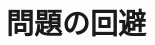 \documentclass[12pt,dvipdfmx,mathserif,uplatex,aspectratio=32]{beamer}
\begin{document}
\section{問題の回避}


\begin{frame}

\end{frame}
\end{document}
